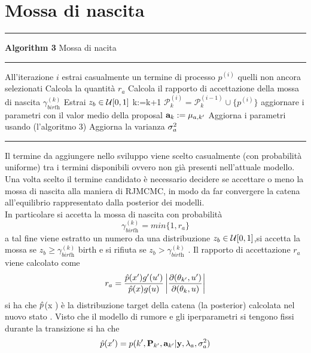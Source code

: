 \section{Mossa di nascita}
\hrule 
\textbf{Algorithm 3} Mossa di nacita
\hrule

\begin{algorithmic}
\State All'iterazione $i$ estrai casualmente un termine di processo $p^{(i)}$ quelli non ancora selezionati
\State Calcola la quantità $r_a$
\State Calcola il rapporto di accettazione della mossa di nascita $\gamma_{\textit{birth}}^{(k)}$
\State Estrai $z_b\in\mathcal{U}[0,1]$
\State k:=k+1
\State $ \mathcal{P}_k^{(i)}= \mathcal{P}_k^{(i-1)}\cup \{p^{(i)}\} $
\State aggiornare i parametri con il valor medio della proposal $\textbf{a}_k:=\mu_{a,k'}$
\Else
\State Aggiorna i parametri usando (l'algoritmo 3)
\State Aggiorna la varianza $\sigma_a^2$
\EndIf
\end{algorithmic}
\hrule
\vspace{2em}


Il termine da aggiungere nello sviluppo viene scelto casualmente (con probabilità
uniforme) tra i termini disponibili ovvero non già presenti nell’attuale modello.
Una volta scelto il termine candidato è necessario decidere se accettare o meno la
mossa di nascita alla maniera di RJMCMC, in modo da far convergere la catena
all’equilibrio rappresentato dalla posterior dei modelli.\\
\vspace{2em}
In particolare si accetta la mossa di nascita con probabilità
\begin{equation}
\gamma_{\textit{birth}}^{(k)}=min\{1,r_a\}
\end{equation}
a tal fine viene estratto un numero da una distribuzione $z_b\in\mathcal{U}[0,1]$,si accetta la
mossa se $z_b\geq \gamma_{\textit{birth}}^{(k)}$ birth e si rifiuta se $z_b> \gamma_{\textit{birth}}^{(k)}$ .
Il rapporto di accettazione $r_a$ viene calcolato come
\begin{equation}
r_a=\frac{\hat{p}(x')g'(u')}{\hat{p}(x)g(u)}\left\vert\frac{\partial(\theta_{k'},u')}{\partial(\theta_{k},u)}\right\vert
\end{equation}
si ha che $\hat{p}$(x ) è la distribuzione target della catena (la posterior) calcolata nel
nuovo stato . Visto che il modello di rumore e gli iperparametri si tengono fissi
durante la transizione si ha che
\begin{equation}
\hat{p}(x')=p(k',\textbf{P}_{k'},\textbf{a}_{k'}|\textbf{y},\lambda_a,\sigma_a^2)
\end{equation}

